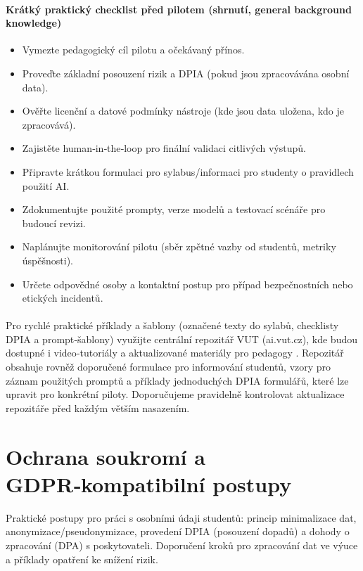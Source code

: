 \documentclass{report}%
\begin{document}
\paragraph{Krátký praktický checklist před pilotem (shrnutí, general background knowledge)}
\begin{itemize}
  \item Vymezte pedagogický cíl pilotu a očekávaný přínos.
  \item Proveďte základní posouzení rizik a DPIA (pokud jsou zpracovávána osobní data).
  \item Ověřte licenční a datové podmínky nástroje (kde jsou data uložena, kdo je zpracovává).
  \item Zajistěte human‑in‑the‑loop pro finální validaci citlivých výstupů.
  \item Připravte krátkou formulaci pro sylabus/informaci pro studenty o pravidlech použití AI.
  \item Zdokumentujte použité prompty, verze modelů a testovací scénáře pro budoucí revizi.
  \item Naplánujte monitorování pilotu (sběr zpětné vazby od studentů, metriky úspěšnosti).
  \item Určete odpovědné osoby a kontaktní postup pro případ bezpečnostních nebo etických incidentů.
\end{itemize}

\paragraph{}
Pro rychlé praktické příklady a šablony (označené texty do sylabů, checklisty DPIA a prompt‑šablony) využijte centrální repozitář VUT (ai.vut.cz), kde budou dostupné i video‑tutoriály a aktualizované materiály pro pedagogy \cite{kb_ai_101_tipu_pdf_04e4a115_page_15_2}. Repozitář obsahuje rovněž doporučené formulace pro informování studentů, vzory pro záznam použitých promptů a příklady jednoduchých DPIA formulářů, které lze upravit pro konkrétní piloty. Doporučujeme pravidelně kontrolovat aktualizace repozitáře před každým větším nasazením.%

%
\section{Ochrana soukromí a GDPR‑kompatibilní postupy}%
Praktické postupy pro práci s osobními údaji studentů: princip minimalizace dat, anonymizace/pseudonymizace, provedení DPIA (posouzení dopadů) a dohody o zpracování (DPA) s poskytovateli. Doporučení kroků pro zpracování dat ve výuce a příklady opatření ke snížení rizik.%
\end{document}
